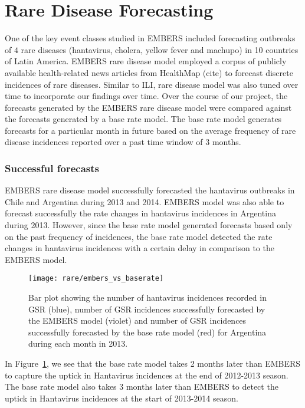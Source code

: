 \section{Rare Disease Forecasting}

One of the key event classes studied in EMBERS included forecasting outbreaks
of $4$ rare diseases (hantavirus, cholera, yellow fever and machupo) in 10
countries of Latin America. EMBERS rare disease model employed a corpus of
publicly available health-related news articles from HealthMap (cite) to
forecast discrete incidences of rare diseases. Similar to ILI, rare disease
model was also tuned over time to incorporate our findings over time. Over the
course of our project, the forecasts generated by the EMBERS rare disease
model were compared against the forecasts generated by a base rate model. The
base rate model generates forecasts for a particular month in future based on
the average frequency of rare disease incidences reported over a past time
window of 3 months.


\subsubsection{Successful forecasts}

EMBERS rare disease model successfully forecasted the hantavirus outbreaks in
Chile and Argentina during 2013 and 2014. EMBERS model was also able to
forecast successfully the rate changes in hantavirus incidences in Argentina
during 2013. However, since the base rate model generated forecasts based only
on the past frequency of incidences, the base rate model detected the rate
changes in hantavirus incidences with a certain delay in comparison to the
EMBERS model.

\begin{figure}
  \texttt{[image: rare/embers\_vs\_baserate]}
  \caption{\label{fig:embers_vs_baserate} Bar plot showing the number of
  hantavirus incidences recorded in GSR ({\color{blue}blue}),
  number of GSR incidences
  successfully forecasted by the EMBERS model ({\color{Violet}violet}) and number of GSR
  incidences successfully forecasted by the base rate model ({\color{red}red}) for
  Argentina during each month in 2013.}
\end{figure}

In Figure~\ref{fig:embers_vs_baserate}, we see that the base rate model takes
2 months later than EMBERS to capture the uptick in Hantavirus incidences at
the end of 2012-2013 season. The base rate model also takes 3 months later
than EMBERS to detect the uptick in Hantavirus incidences at the start of
2013-2014 season.



